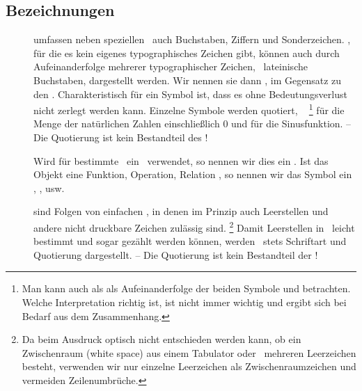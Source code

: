 \subsection{Bezeichnungen}%
\label{sub:Bezeichnungen}

\begin{description}

	\item [\Symbole] umfassen neben speziellen \Symbolen\ auch Buchstaben, Ziffern und Sonderzeichen.
	\Symbole, für die es kein eigenes typographisches Zeichen gibt, können auch durch Aufeinanderfolge mehrerer typographischer Zeichen, \textiAlg\ lateinische Buchstaben, dargestellt werden.
	Wir nennen sie dann , im Gegensatz zu den .
	Charakteristisch für ein Symbol ist, dass es ohne Bedeutungsverlust nicht zerlegt werden kann.
	Einzelne Symbole werden  quotiert, \textzB\ \chrqt{$\INo$}%
	\footnote{%
		Man kann \chrqt{$\INo$} auch als als Aufeinanderfolge der beiden Symbole \chrqt{$\IN$} und  betrachten.
		Welche Interpretation richtig ist, ist nicht immer wichtig und ergibt sich bei Bedarf aus dem Zusammenhang.
	}
	für die Menge der natürlichen Zahlen einschließlich 0 und \chrqt{$\sin$} für die Sinusfunktion.
	-- Die Quotierung ist kein Bestandteil des \Symbols!

	Wird für bestimmte \Objekte\ ein \Symbol\ verwendet, so nennen wir dies ein .
	Ist das Objekt eine Funktion, Operation, Relation \textusw, so nennen wir das Symbol ein , ,  usw.

	\item [\Zeichenketten] sind Folgen von einfachen \Symbolen, in denen im Prinzip auch Leerstellen und andere nicht druckbare Zeichen zulässig sind.%
	\footnote{%
		Da beim Ausdruck optisch nicht entschieden werden kann, ob ein Zwischenraum (white space) aus einem Tabulator oder \textevtl\ mehreren Leerzeichen besteht, verwenden wir nur einzelne Leerzeichen als Zwischenraumzeichen und vermeiden Zeilenumbrüche.
	}
	Damit Leerstellen in \Zeichenketten\ leicht bestimmt und sogar gezählt werden können,
	werden \Zeichenketten\ stets  Schriftart und Quotierung dargestellt.
	-- Die Quotierung ist kein Bestandteil der \Zeichenkette!


\end{description}
